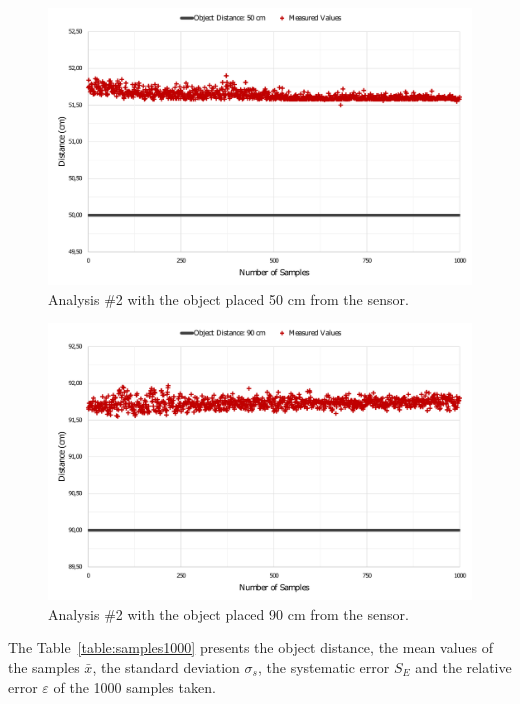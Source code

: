 \begin{figure}[h!]
    \centering
    \includegraphics[scale=0.5]{images/Results/testing_methodology/conf50.pdf}
    \caption{Analysis \#2 with the object placed 50 cm from the sensor.}
    \label{fig:conf50TEXT}
\end{figure}
\clearpage
\begin{figure}[h!]
    \centering
    \includegraphics[scale=0.5]{images/Results/testing_methodology/conf90.pdf}
    \caption{Analysis \#2 with the object placed 90 cm from the sensor.}
    \label{fig:conf90TEXT}
\end{figure}

The Table~\ref{table:samples1000} presents the object distance, the mean values of the samples $\bar{x}$, the standard deviation $\sigma_s$, the systematic error $S_E$ and the relative error $\varepsilon$ of the 1000 samples taken. 

